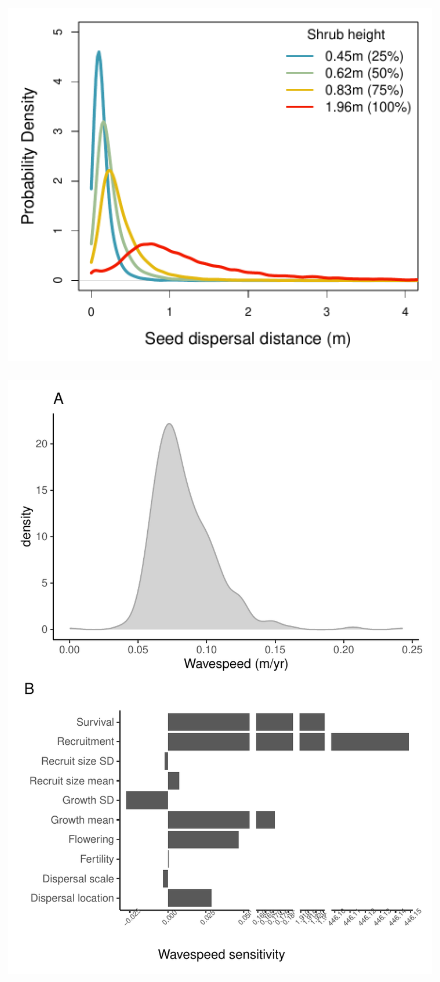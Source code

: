 \documentclass[11pt]{article}\usepackage[]{graphicx}\usepackage[usenames,dvipsnames]{xcolor}
\begin{document}
\newpage
\begin{figure}[H]
  \begin{center}
    \includegraphics[width=\linewidth]{Figures/DispersalKernels}
  \caption{}
  \label{fig:dispersal}
  \end{center}
\end{figure}

\newpage
\begin{figure}[H]
  \begin{center}
    \includegraphics[width=\linewidth]{Figures/WavespeedSens}
  \caption{}
  \label{fig:wavespeed}
  \end{center}
\end{figure}
\end{document}
